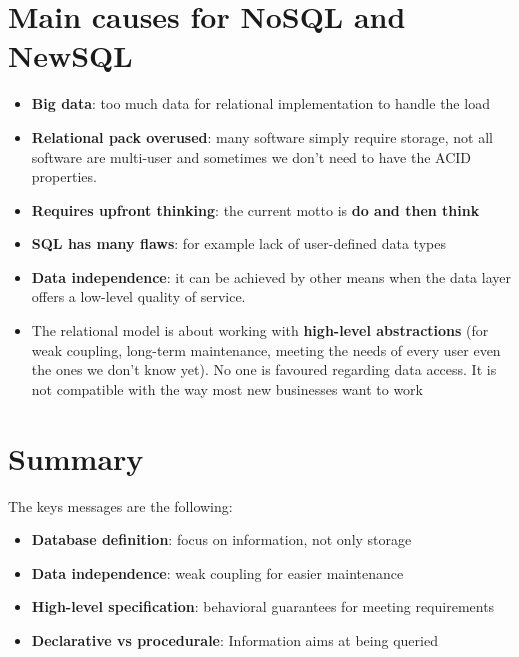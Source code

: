 \section{Main causes for NoSQL and NewSQL}

\begin{itemize}
    \item \textbf{Big data}: too much data for relational implementation to handle the load
    \item \textbf{Relational pack overused}: many software simply require storage, not all software are multi-user and sometimes we don't need to have the ACID properties.
    \item \textbf{Requires upfront thinking}: the current motto is \textbf{do and then think}
    \item \textbf{SQL has many flaws}: for example lack of user-defined data types
    \item \textbf{Data independence}: it can be achieved by other means when the data layer offers a low-level quality of service.
    \item The relational model is about working with \textbf{high-level abstractions} (for weak coupling, long-term maintenance, meeting the needs of every user even the ones we don't know yet). No one is favoured regarding data access. It is not compatible with the way most new businesses want to work
\end{itemize}

\section{Summary}

The keys messages are the following:\\

\begin{itemize}
    \item \textbf{Database definition}: focus on information, not only storage
    \item \textbf{Data independence}: weak coupling for easier maintenance
    \item \textbf{High-level specification}: behavioral guarantees for meeting requirements
    \item \textbf{Declarative vs procedurale}: Information aims at being queried
\end{itemize}


